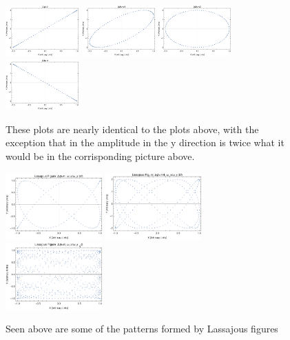 \documentclass{article}
\begin{document}
\begin{figure}[b]
\begin{center}
\includegraphics[width=0.25\textwidth]{plot5.pdf}
\includegraphics[width=0.25\textwidth]{plot6.pdf}
\includegraphics[width=0.25\textwidth]{plot7.pdf}
\includegraphics[width=0.25\textwidth]{plot8.pdf}
\end{center}
\caption{These plots are nearly identical to the plots above, with the exception that in the amplitude in the y direction is twice what it would be in the corrisponding picture above.}
\end{figure}

\begin{figure}[b]
\begin{center}
\includegraphics[width=0.33\textwidth]{plot9.pdf}
\includegraphics[width=0.33\textwidth]{plot10.pdf}
\includegraphics[width=0.33\textwidth]{plot11.pdf}
\end{center}
\caption{Seen above are some of the patterns formed by Lassajous figures}
\label{lissa}
\end{figure}
\end{document}
